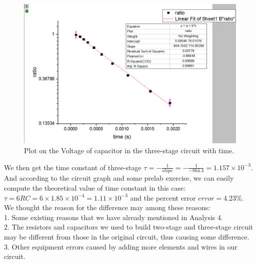 \begin{figure}[!htbp]
	\centering %
	\includegraphics[width=\linewidth]{images/2_8.PNG} %
	\caption{Plot on the Voltage of capacitor in the three-stage circuit with time.} %
	\label{fig:2.8} %
\end{figure}
\phantom{ } We then get the time constant of three-stage 
$\tau = -\frac{1}{slope} = -\frac{1}{-864.4} = 1.157\times10^{-3} $.\\ And according to the circuit graph and some prelab exercise, we can easily compute
the theoretical value of time constant in this case:\\
$\tau = 6RC = 6\times1.85\times10^{-4} = 1.11\times10^{-3}$ and the percent error $error = 4.23\%$.\\
We thought the reason for the difference may among these reasons:\\
1. Some existing reasons that we have already mentioned in Analysis 4.\\
2. The resistors and capacitors we used to build two-stage and three-stage circuit may be different from those in the original circuit, thus causing some difference.\\
3. Other equipment errors caused by adding more elements and wires in our circuit.\\

